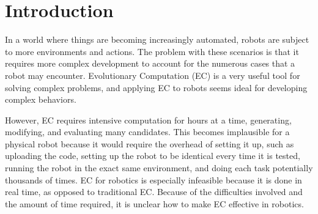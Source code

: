 \documentclass{sig-alternate}
\newcommand{\mycomment}[1]{\textcolor{red}{#1}}
\begin{document}




	
\section{Introduction}
 In a world where things are becoming increasingly automated, robots  are subject to more environments and actions. The problem with these scenarios is that it requires more complex development to account for the numerous cases that a robot may encounter. Evolutionary Computation (EC) is a very useful tool for solving complex problems, and applying EC to robots seems ideal for developing complex behaviors.
 
 However, EC requires intensive computation for hours at a time, generating, modifying, and evaluating many candidates. This becomes implausible for a physical robot because it would require the overhead of setting it up, such as uploading the code, setting up the robot to be identical every time it is tested, running the robot in the exact same environment, and doing each task potentially thousands of times. EC for robotics is especially infeasible because it is done in real time, as opposed to traditional EC. Because of the difficulties involved and the amount of time required, it is unclear how to make EC effective in robotics.
 
\end{document}
